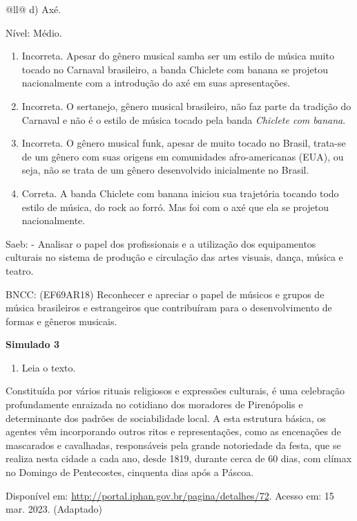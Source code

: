 \begin{itemize}
\begin{itemize}
\begin{escolha}[]{@{}ll@{}}
d) Axé.

Nível: Médio.

\begin{enumerate}
\def\labelenumi{\alph{enumi})}
\item
  Incorreta. Apesar do gênero musical samba ser um estilo de música
  muito tocado no Carnaval brasileiro, a banda Chiclete com banana se
  projetou nacionalmente com a introdução do axé em suas apresentações.
\item
  Incorreta. O sertanejo, gênero musical brasileiro, não faz parte da
  tradição do Carnaval e não é o estilo de música tocado pela banda
  \emph{Chiclete com banana}.
\item
  Incorreta. O gênero musical funk, apesar de muito tocado no Brasil,
  trata-se de um gênero com suas origens em comunidades afro-americanas
  (EUA), ou seja, não se trata de um gênero desenvolvido inicialmente no
  Brasil.
\item
  Correta. A banda Chiclete com banana iniciou sua trajetória tocando
  todo estilo de música, do rock ao forró. Mas foi com o axé que ela se
  projetou nacionalmente.
\end{enumerate}

Saeb: - Analisar o papel dos profissionais e a utilização dos
equipamentos culturais no sistema de produção e circulação das artes
visuais, dança, música e teatro.

BNCC: (EF69AR18) Reconhecer e apreciar o papel de músicos e grupos de
música brasileiros e estrangeiros que contribuíram para o
desenvolvimento de formas e gêneros musicais.

\textbf{Simulado 3}

\begin{enumerate}
\def\labelenumi{\arabic{enumi}.}
\item
  Leia o texto.
\end{enumerate}

Constituída por vários rituais religiosos e expressões culturais, é uma
celebração profundamente enraizada no cotidiano dos moradores de
Pirenópolis e determinante dos padrões de sociabilidade local. A esta
estrutura básica, os agentes vêm incorporando outros ritos e
representações, como as encenações de mascarados e cavalhadas,
responsáveis pela grande notoriedade da festa, que se realiza nesta
cidade a cada ano, desde 1819, durante cerca de 60 dias, com clímax no
Domingo de Pentecostes, cinquenta dias após a Páscoa.

Disponível em: \url{http://portal.iphan.gov.br/pagina/detalhes/72}.
Acesso em: 15 mar. 2023. (Adaptado)


\end{escolha}
\end{itemize}
\end{itemize}
